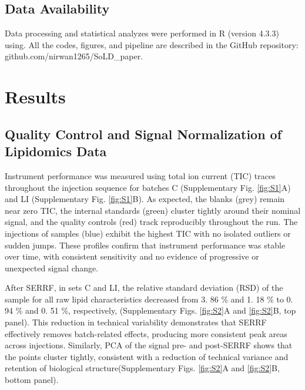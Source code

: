 \documentclass[10pt,letterpaper]{article}
\begin{document}
\subsection*{Data Availability}
Data processing and statistical analyzes were performed in R (version 4.3.3) using. All the codes, figures, and pipeline are described in the GitHub repository: github.com/nirwan1265/SoLD\_paper.

\section*{Results}

\subsection*{Quality Control and Signal Normalization of Lipidomics Data}
Instrument performance was measured using total ion current (TIC) traces throughout the injection sequence for batches C (Supplementary Fig. \ref{fig:S1}A) and LI (Supplementary Fig. \ref{fig:S1}B). As expected, the blanks (grey) remain near zero TIC, the internal standards (green) cluster tightly around their nominal signal, and the quality controls (red) track reproducibly throughout the run. The injections of samples (blue) exhibit the highest TIC with no isolated outliers or sudden jumps. These profiles confirm that instrument performance was stable over time, with consistent sensitivity and no evidence of progressive or unexpected signal change.

After SERRF, in sets C and LI, the relative standard deviation (RSD) of the sample  for all raw lipid characteristics decreased from 3. 86 \% and 1. 18 \%  to 0. 94 \% and 0. 51 \%, respectively,  (Supplementary Figs. \ref{fig:S2}A and \ref{fig:S2}B, top panel). This reduction in technical variability demonstrates that SERRF effectively removes batch-related effects, producing more consistent peak areas across injections. Similarly, PCA of the signal pre- and post-SERRF shows that the points cluster tightly, consistent with a reduction of technical variance and retention of biological structure(Supplementary Figs. \ref{fig:S2}A and \ref{fig:S2}B, bottom panel).
\end{document}

